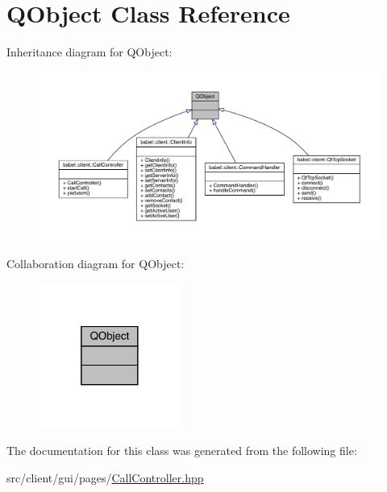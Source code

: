 \hypertarget{class_q_object}{}\section{Q\+Object Class Reference}
\label{class_q_object}


Inheritance diagram for Q\+Object\+:\nopagebreak
\begin{figure}[H]
\begin{center}
\leavevmode
\includegraphics[width=350pt]{class_q_object__inherit__graph}
\end{center}
\end{figure}


Collaboration diagram for Q\+Object\+:\nopagebreak
\begin{figure}[H]
\begin{center}
\leavevmode
\includegraphics[width=133pt]{class_q_object__coll__graph}
\end{center}
\end{figure}


The documentation for this class was generated from the following file\+:\begin{DoxyCompactItemize}
\item 
src/client/gui/pages/\mbox{\hyperlink{_call_controller_8hpp}{Call\+Controller.\+hpp}}\end{DoxyCompactItemize}
